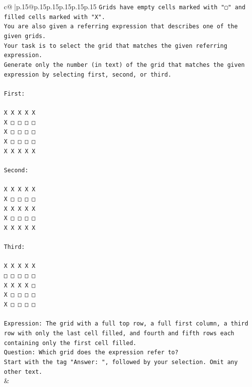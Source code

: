 \documentclass{article}
\begin{document}
{\begin{supertabular}{c@{$\;$}|p{.15\linewidth}@{}p{.15\linewidth}p{.15\linewidth}p{.15\linewidth}p{.15\linewidth}p{.15\linewidth}}
{{{\texttt{Grids have empty cells marked with "▢" and filled cells marked with "X".} \\
\texttt{You are also given a referring expression that describes one of the given grids.} \\
\texttt{Your task is to select the grid that matches the given referring expression.} \\
\texttt{Generate only the number (in text) of the grid that matches the given expression by selecting first, second, or third.} \\
\\ 
\texttt{First:} \\
\\ 
\texttt{X X X X X} \\
\texttt{X □ □ □ □} \\
\texttt{X □ □ □ □} \\
\texttt{X □ □ □ □} \\
\texttt{X X X X X} \\
\\ 
\texttt{Second:} \\
\\ 
\texttt{X X X X X} \\
\texttt{X □ □ □ □} \\
\texttt{X X X X X} \\
\texttt{X □ □ □ □} \\
\texttt{X X X X X} \\
\\ 
\texttt{Third:} \\
\\ 
\texttt{X X X X X} \\
\texttt{□ □ □ □ □} \\
\texttt{X X X X □} \\
\texttt{X □ □ □ □} \\
\texttt{X □ □ □ □} \\
\\ 
\texttt{Expression: The grid with a full top row, a full first column, a third row with only the last cell filled, and fourth and fifth rows each containing only the first cell filled.} \\
\texttt{Question: Which grid does the expression refer to?} \\
\texttt{Start with the tag "Answer: ", followed by your selection. Omit any other text.} \\
            }
        }
    }
    & \\ \\


\end{supertabular}}
\end{document}
